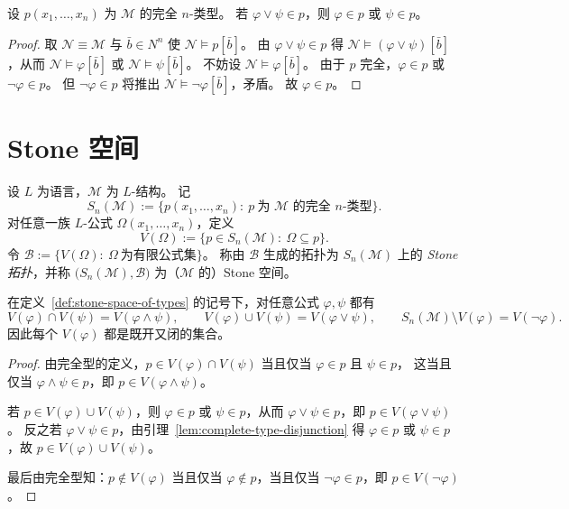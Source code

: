 \documentclass[lang=cn,a4paper,newtx,section]{elegantbook}
\begin{document}
\begin{lemma}
\label{complete-type-disjunction}
设 $p(x_1,\dots,x_n)$ 为 $\mathcal M$ 的完全 $n$-类型。
若 $\varphi\vee\psi\in p$，则 $\varphi\in p$ 或 $\psi\in p$。
\end{lemma}

\begin{proof}
取 $\mathcal N\equiv\mathcal M$ 与 $\bar b\in N^n$ 使 $\mathcal N\models p[\bar b]$。
由 $\varphi\vee\psi\in p$ 得 $\mathcal N\models(\varphi\vee\psi)[\bar b]$，从而 $\mathcal N\models\varphi[\bar b]$ 或 $\mathcal N\models\psi[\bar b]$。
不妨设 $\mathcal N\models\varphi[\bar b]$。
由于 $p$ 完全，$\varphi\in p$ 或 $\neg\varphi\in p$。
但 $\neg\varphi\in p$ 将推出 $\mathcal N\models\neg\varphi[\bar b]$，矛盾。
故 $\varphi\in p$。
\end{proof}

\section{Stone 空间}

\begin{definition}
\label{stone-space-of-types}
设 $L$ 为语言，$\mathcal M$ 为 $L$-结构。
记
\[
  S_n(\mathcal M):=\{p(x_1,\dots,x_n):\ p\ \text{为 $\mathcal M$ 的完全 $n$-类型}\}.
\]
对任意一族 $L$-公式 $\Omega(x_1,\dots,x_n)$，定义
\[
  V(\Omega):=\{p\in S_n(\mathcal M):\ \Omega\subseteq p\}.
\]
令 $\mathcal B:=\{V(\Omega):\ \Omega\ \text{为有限公式集}\}$。
称由 $\mathcal B$ 生成的拓扑为 $S_n(\mathcal M)$ 上的 \emph{Stone 拓扑}，并称 $\bigl(S_n(\mathcal M),\mathcal B\bigr)$ 为（$\mathcal M$ 的）Stone 空间。
\end{definition}

\begin{proposition}
\label{stone-basic-operations}
在定义~\ref{def:stone-space-of-types} 的记号下，对任意公式 $\varphi,\psi$ 都有
\[
  V(\varphi)\cap V(\psi)=V(\varphi\wedge\psi),\qquad V(\varphi)\cup V(\psi)=V(\varphi\vee\psi),\qquad S_n(\mathcal M)\setminus V(\varphi)=V(\neg\varphi).
\]
因此每个 $V(\varphi)$ 都是既开又闭的集合。
\end{proposition}

\begin{proof}
由完全型的定义，$p\in V(\varphi)\cap V(\psi)$ 当且仅当 $\varphi\in p$ 且 $\psi\in p$，
这当且仅当 $\varphi\wedge\psi\in p$，即 $p\in V(\varphi\wedge\psi)$。

若 $p\in V(\varphi)\cup V(\psi)$，则 $\varphi\in p$ 或 $\psi\in p$，从而 $\varphi\vee\psi\in p$，即 $p\in V(\varphi\vee\psi)$。
反之若 $\varphi\vee\psi\in p$，由引理~\ref{lem:complete-type-disjunction} 得 $\varphi\in p$ 或 $\psi\in p$，故 $p\in V(\varphi)\cup V(\psi)$。

最后由完全型知：$p\notin V(\varphi)$ 当且仅当 $\varphi\notin p$，当且仅当 $\neg\varphi\in p$，即 $p\in V(\neg\varphi)$。
\end{proof}
\end{document}
